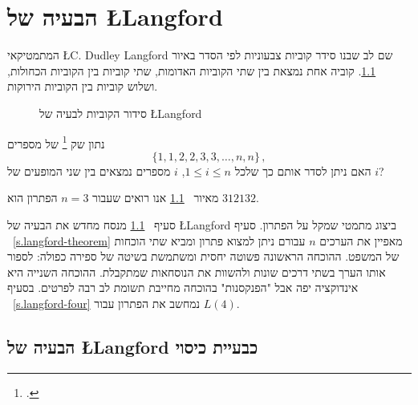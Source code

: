 
\chapter%
[הבעיה של 
\L{\normalsize Langford}]%
{הבעיה של 
\L{\Large Langford}}
\label{c.langford}

המתמטיקאי
\L{C. Dudley Langford}
שם לב שבנו סידר קוביות צבעוניות לפי הסדר באיור%
~\ref{f.langford}.
קוביה אחת נמצאת בין שתי הקוביות האדומות, שתי קוביות בין הקוביות הכחולות, ושלוש קוביות בין הקוביות הירוקות.  
\begin{figure}[h]
\begin{center}
\end{center}
\caption{סידור הקוביות לבעיה של \L{Langford}}\label{f.langford}
\end{figure}

\begin{definition}
נתון שק%
\footnote{.} 
של מספרים
\[
\{1,1,2,2,3,3,\ldots,n,n\}\,,
\]
האם ניתן לסדר אותם כך שלכל
$1\leq i \leq n$, $i$
מספרים נמצאים בין שני המופעים של
$i$?
\end{definition}
מאיור%
~\ref{f.langford}
אנו רואים שעבור 
$n=3$
הפתרון הוא
$312132$.

סעיף%
~\ref{s.langford-covering} 
מנסח מחדש את הבעיה של
\L{Langford}
ביצוג מתמטי שמקל על הפתרון. סעיף%
~\ref{s.langford-theorem}
מאפיין את הערכים 
$n$
עבורם ניתן למצוא פתרון ומביא שתי הוכחות של המשפט. ההוכחה הראשונה פשוטה יחסית ומשתמשת בשיטה של ספירה כפולה: לספור אותו הערך בשתי דרכים שונות ולהשוות את הנוסחאות שמתקבלת. ההוכחה השנייה היא אינדוקציה יפה אבל "הפנקסנות" בהוכחה מחייבת תשומת לב רבה לפרטים. בסעיף%
~\ref{s.langford-four}
נמחשב את הפתרון עבור
$L(4)$.


\section{הבעיה של
\L{\normalsize Langford}
כבעיית כיסוי}
\label{s.langford-covering}

